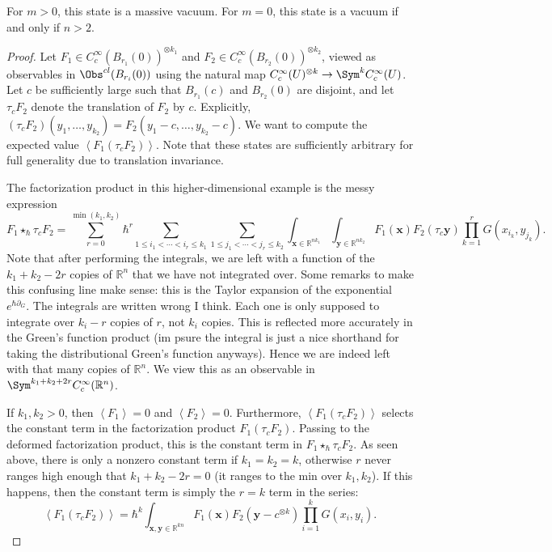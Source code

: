 \begin{lemma}\label{lma:4-9-3}
	For $m>0$, this state is a massive vacuum. For $m=0$, this state is a vacuum if and only if $n>2$.
\end{lemma}
\begin{proof}
	Let $F_1\in C^\infty _c(B_{r_1} (0))^{\otimes k_1} $ and $F_2\in C^\infty_c(B_{r_2} (0))^{\otimes k_2} $, viewed as observables in $\Obs^{cl} (B_{r_i} (0))$ using the natural map $C^\infty _c(U)^{\otimes k} \to \Sym ^k C^\infty _c(U)$. Let $c$ be sufficiently large such that $B_{r_1} (c)$ and $B_{r_2} (0)$ are disjoint, and let $\tau _cF_2$ denote the translation of $F_2$ by $c$. Explicitly, $(\tau _cF_2)(y_1, \ldots ,y_{k_2} ) = F_2(y_1-c, \ldots ,y_{k_2} -c)$. We want to compute the expected value $\left\langle F_1(\tau_cF_2) \right\rangle $. Note that these states are sufficiently arbitrary for full generality due to translation invariance.

	The factorization product in this higher-dimensional example is the messy expression
	\[
		F_1 \star _{\hbar } \tau _cF_2=\sum_{r=0}^{\min (k_1,k_2)} \hbar ^r \sum_{1\leq i_1 < \cdots < i_r \leq k_1} \sum_{1\leq j_1 < \cdots < j_r \leq k_2} \int_{\mathbf{x} \in\mathbb{R} ^{nk_1} } \int_{\mathbf{y} \in\mathbb{R} ^{nk_2} } F_1(\mathbf{x} )F_2(\tau _c \mathbf{y} )\prod_{k=1}^{r} G(x_{i_k} ,y_{j_k} )
	.\]
	Note that after performing the integrals, we are left with a function of the $k_1+k_2 - 2r$ copies of $\mathbb{R} ^n$ that we have not integrated over. Some remarks to make this confusing line make sense: this is the Taylor expansion of the exponential $e^{\hbar \partial _G} $. The integrals are written wrong I think. Each one is only supposed to integrate over $k_i - r$ copies of $r$, not $k_i$ copies. This is reflected more accurately in the Green's function product (im psure the integral is just a nice shorthand for taking the distributional Green's function anyways). Hence we are indeed left with that many copies of $\mathbb{R} ^n$. We view this as an observable in $\Sym ^{k_1+k_2+2r} C^\infty _c(\mathbb{R} ^n)$.

	If $k_1,k_2 > 0$, then $\left\langle F_1 \right\rangle =0$ and $\left\langle F_2 \right\rangle =0$. Furthermore, $\left\langle F_1(\tau _cF_2) \right\rangle $ selects the constant term in the factorization product $F_1(\tau _cF_2)$. Passing to the deformed factorization product, this is the constant term in $F_1\star _{\hbar } \tau _cF_2$. As seen above, there is only a nonzero constant term if $k_1 = k_2 = k$, otherwise $r$ never ranges high enough that $k_1 + k_2 - 2r = 0$ (it ranges to the min over $k_1,k_2$). If this happens, then the constant term is simply the $r=k$ term in the series:
	\[
		\left\langle F_1(\tau _cF_2) \right\rangle =\hbar ^k \int_{\mathbf{x},\mathbf{y}\in\mathbb{R}^{kn}} F_1(\mathbf{x} )F_2(\mathbf{y} - c^{\otimes k} )\prod_{i=1}^{k} G(x_i,y_i)
	.\]
	

\end{proof}
